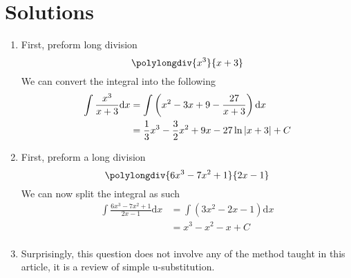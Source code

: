 \documentclass{article}
\numberwithin{equation}{section}
\begin{document}
\section{Solutions}
\begin{enumerate}
    \item First, preform long division
    \[
    \polylongdiv{x^3}{x+3}
    \]
    We can convert the integral into the following
    \begin{align*}
        \int \frac{x^3}{x+3}\mathrm{d}x &= \int \left(x^2 - 3x + 9 - \frac{27}{x+3}\right) \mathrm{d}x\\
        &= \frac{1}{3}x^3 - \frac{3}{2} x^2 + 9x - 27\ln{\abs{x+3}} + C\\
    \end{align*}
    \item First, preform a long division
    \[
    \polylongdiv{6x^3-7x^2+1}{2x-1}
    \]
    We can now split the integral as such
    \begin{align*}
        \int \frac{6x^3-7x^2+1}{2x-1}\mathrm{d}x &= \int \left(3x^2-2x-1\right) \mathrm{d}x\\
        &= x^3 - x^2 - x + C\\
    \end{align*}
    \item Surprisingly, this question does not involve any of the method taught in this article, it is a review of simple u-substitution.
    

\end{enumerate}
\end{document}
